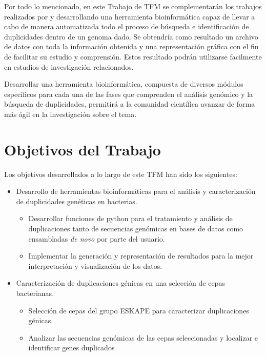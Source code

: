Por todo lo mencionado, en este Trabajo de TFM se complementarán los trabajos realizados por \cite{bernabeu_gene_2019} y \cite{sanchez-herrero_gene_2020} desarrollando una herramienta bioinformática capaz de llevar a cabo de manera automatizada todo el proceso de búsqueda e identificación de duplicidades dentro de un genoma dado. Se obtendría como resultado un archivo de datos con toda la información obtenida y una representación gráfica con el fin de facilitar su estudio y comprensión. Estos resultado podrán utilizarse facilmente en estudios de investigación relacionados.

Desarrollar una herramienta bioinformática, compuesta de diversos módulos específicos para cada una de las fases que comprenden el análisis genómico y la búsqueda de duplicidades, permitirá a la comunidad científica avanzar de forma más ágil en la investigación sobre el tema.



\section{Objetivos del Trabajo}

Los objetivos desarrollados a lo largo de este TFM han sido los siguientes:
\begin{itemize}
    \item Desarrollo de herramientas bioinformáticas para el análisis y caracterización de duplicidades genéticas en bacterias.
    \begin{itemize}
        \item Desarrollar funciones de python para el tratamiento y análisis de duplicaciones tanto de secuencias genómicas en bases de datos como ensambladas \textit{de novo} por parte del usuario.
        \item Implementar la generación y representación de resultados para la mejor interpretación y visualización de los datos.
    \end{itemize}
    \item Caracterización de duplicaciones génicas en una selección de cepas bacterianas.
    \begin{itemize}
        \item Selección de cepas del grupo ESKAPE para caracterizar duplicaciones génicas.
        \item Analizar las secuencias genómicas de las cepas seleccionadas y localizar e identificar genes duplicados
    \end{itemize}
\end{itemize}

